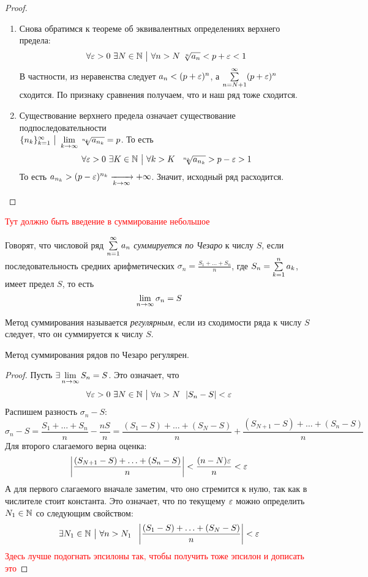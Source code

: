 \begin{proof}~
	\begin{enumerate}
		\item Снова обратимся к теореме об эквивалентных определениях верхнего предела:
		\[
			\forall \varepsilon > 0\ \exists N \in \mathbb{N} \ \big|\  \forall n > N\ \sqrt[n]{a_n} < p + \varepsilon < 1
		\]
		В частности, из неравенства следует $a_n < (p + \varepsilon)^n$, а $\sum\limits_{n = N + 1}^\infty (p + \varepsilon)^n$ сходится. По признаку сравнения получаем, что и наш ряд тоже сходится.
		
		\item Существование верхнего предела означает существование подпоследовательности \\ $\{n_k\}_{k = 1}^\infty \ \big|\  \lim\limits_{k \to \infty} \sqrt[n_k]{a_{n_k}} = p$. То есть
		\[
			\forall \varepsilon > 0\ \exists K \in \mathbb{N} \ \big|\  \forall k > K\ \ \sqrt[n_k]{a_{n_k}} > p - \varepsilon > 1
		\]
		То есть $a_{n_k} > (p - \varepsilon)^{n_k} \xrightarrow[k \to \infty]{} +\infty$. Значит, исходный ряд расходится.
	\end{enumerate}
\end{proof}

\begin{example}
	\textcolor{red}{Тут должно быть введение в суммирование небольшое}
\end{example}

\begin{definition}
	Говорят, что числовой ряд $\sum\limits_{n = 1}^\infty a_n$ \textit{суммируется по Чезаро} к числу $S$, если последовательность средних арифметических $\sigma_n = \frac{S_1 + \ldots + S_n}{n}$, где $S_n = \sum\limits_{k = 1}^n a_k$, имеет предел $S$, то есть
	\[
		\lim\limits_{n \to \infty} \sigma_n = S
	\]
\end{definition}

\begin{definition}
	Метод суммирования называется \textit{регулярным}, если из сходимости ряда к числу $S$ следует, что он суммируется к числу $S$.
\end{definition}

\begin{theorem}
	Метод суммирования рядов по Чезаро регулярен.
\end{theorem}

\begin{proof}
	Пусть $\exists \lim\limits_{n \to \infty} S_n = S$. Это означает, что
	\[
		\forall \varepsilon > 0\ \exists N \in \mathbb{N} \ \big|\  \forall n > N\ \ |S_n - S| < \varepsilon
	\]
	Распишем разность $\sigma_n - S$:
	\[
		\sigma_n - S = \frac{S_1 + \ldots + S_n}{n} - \frac{nS}{n} = \frac{(S_1 - S) + \ldots + (S_N - S)}{n} + \frac{(S_{N + 1} - S) + \ldots + (S_n - S)}{n}
	\]
	Для второго слагаемого верна оценка:
	\[
		\left|\frac{(S_{N + 1} - S) + \ldots + (S_n - S)}{n}\right| < \frac{(n - N)\varepsilon}{n} < \varepsilon
	\]
	А для первого слагаемого вначале заметим, что оно стремится к нулю, так как в числителе стоит константа. Это означает, что по текущему $\varepsilon$ можно определить $N_1 \in \mathbb{N}$ со следующим свойством:
	\[
		\exists N_1 \in \N \such \forall n > N_1\ \ \left|\frac{(S_1 - S) + \ldots + (S_N - S)}{n}\right| < \eps
	\]
	\textcolor{red}{Здесь лучше подогнать эпсилоны так, чтобы получить тоже эпсилон и дописать это}
\end{proof}

